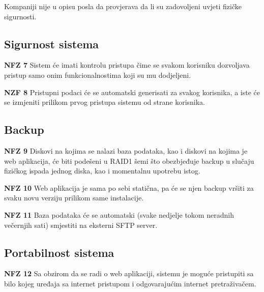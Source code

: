 \documentclass[]{report}
\begin{document}
Kompaniji nije u opisu posla da provjerava da li su zadovoljeni uvjeti fizičke sigurnosti.

\subsection{Sigurnost sistema}

\begin{compactitem}

\item \textbf{NFZ 7} Sistem će imati kontrolu pristupa čime se svakom korisniku dozvoljava pristup samo onim funkcionalnostima koji su mu dodjeljeni.
\vspace*{0.5cm}
\item \textbf{NZF 8} Pristupni podaci će se automatski generisati za svakog korisnika, a iste će se izmjeniti prilikom prvog pristupa sistemu od strane korisnika.

\end{compactitem}

\subsection{Backup}
\begin{compactitem} 
    \item \textbf{NFZ 9} Diskovi na kojima se nalazi baza podataka, kao i diskovi na kojima je web aplikacija, će biti podešeni u RAID1 šemi što obezbjeđuje backup u slučaju fizičkog ispada jednog diska, kao i momentalnu upotrebu istog. 
    \vspace*{0.2cm}
    \item \textbf{NFZ 10} Web aplikacija je sama po sebi statična, pa će se njen backup vršiti za svaku novu verziju prilikom same instalacije.
    \vspace*{0.2cm}
    \item \textbf{NFZ 11} Baza podataka će se automatski (svake nedjelje tokom neradnih večernjih sati) smjestiti na eksterni  SFTP server.
\end{compactitem}

\subsection{Portabilnost sistema}

\begin{compactitem}
\item \textbf{NFZ 12} Sa obzirom da se radi o web aplikaciji, sistemu je moguće pristupiti sa bilo kojeg uređaja sa internet pristupom i odgovarajućim internet pretraživačem.
\end{compactitem}
\end{document}
